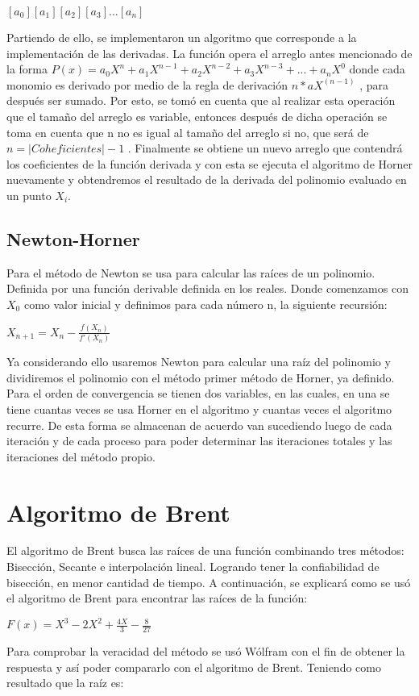 \documentclass{article}
\begin{document}
$[a_0 ]       [a_1 ]        [a_2 ]       [a_3 ]          …       [a_n ]$

Partiendo de ello, se implementaron un algoritmo que corresponde a la implementación de las derivadas. La función opera el arreglo antes mencionado de la forma $P(x)=a_0X^{n} + a_1X^{n-1}+a_2X^{n-2}+a_3X^{n-3}+...+a_nX^{0}$ donde cada monomio es derivado por medio de la regla de derivación $n*aX^(n-1)$ ,  para después ser sumado. Por esto, se tomó en cuenta que al realizar esta operación que el tamaño del arreglo es variable, entonces después de dicha operación se toma en cuenta que n no es igual al tamaño del arreglo si no, que será de $n=|Coheficientes|-1$ . 
Finalmente se obtiene un nuevo arreglo que contendrá los coeficientes de la función derivada y con esta se ejecuta el algoritmo de Horner nuevamente y obtendremos el resultado de la derivada del polinomio evaluado en un punto $X_i$.
\subsection{Newton-Horner}
Para el método de Newton se usa para calcular las raíces de un polinomio. Definida por una función derivable definida en los reales. Donde comenzamos con $X_0$ como valor inicial y definimos para cada número n, la siguiente recursión:

$X_{n+1}=X_n-\frac{f(X_n)}{f'(X_n)}$

Ya considerando ello usaremos Newton para calcular una raíz del polinomio y dividiremos el polinomio con el método primer método de Horner, ya definido. Para el orden de convergencia se tienen dos variables, en las cuales, en una se tiene cuantas veces se usa Horner en el algoritmo y cuantas veces el algoritmo recurre. De esta forma se almacenan de acuerdo van sucediendo luego de cada iteración y de cada proceso para poder determinar las iteraciones totales y las iteraciones del método propio. 
\section{Algoritmo de Brent}
El algoritmo de Brent busca las raíces de una función combinando tres métodos: Bisección, Secante e interpolación lineal. Logrando tener la confiabilidad de bisección, en menor cantidad de tiempo. A continuación, se explicará como se usó el algoritmo de Brent para encontrar las raíces de la función: 

$F(x)=X^{3}-2X^{2}+\frac{4X}{3}-\frac{8}{27}$

Para comprobar la veracidad del método se usó Wólfram con el fin de obtener la respuesta y así poder compararlo con el algoritmo de Brent. Teniendo como resultado que la raíz es:
\end{document}
